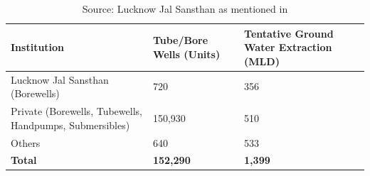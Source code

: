 \begin{table}[h!]
\centering
\caption{Groundwater Extraction in Lucknow}
\begin{tabular}{|p{4.5cm}|p{3cm}|p{4cm}|}
\hline
\textbf{Institution} & \textbf{Tube/Bore Wells (Units)} & \textbf{Tentative Ground Water Extraction (MLD)} \\ \hline
Lucknow Jal Sansthan (Borewells) & 720 & 356 \\ \hline
Private (Borewells, Tubewells, Handpumps, Submersibles) & 150,930 & 510 \\ \hline
Others & 640 & 533 \\ \hline
\textbf{Total} & \textbf{152,290} & \textbf{1,399} \\ \hline
\end{tabular}
\caption*{Source: Lucknow Jal Sansthan as mentioned in \citep{sinha_state_2021} }
\end{table}

